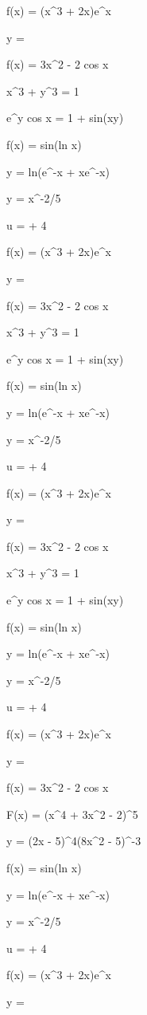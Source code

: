 \documentclass[11pt,a4paper]{article}
\begin{document}
f(x) = (x^3 + 2x)e^x

y = 

f(x) = 3x^2 - 2 cos x


 x^3 + y^3 = 1

 e^y cos x = 1 + sin(xy)

 f(x) = sin(ln x)

 y = ln(e^{-x} + xe^{-x})

y = x^{-2/5}

u =  + 4

f(x) = (x^3 + 2x)e^x

y = 

f(x) = 3x^2 - 2 cos x


 x^3 + y^3 = 1

 e^y cos x = 1 + sin(xy)

 f(x) = sin(ln x)

 y = ln(e^{-x} + xe^{-x})

y = x^{-2/5}

u =  + 4

f(x) = (x^3 + 2x)e^x

y = 

f(x) = 3x^2 - 2 cos x


 x^3 + y^3 = 1

 e^y cos x = 1 + sin(xy)

 f(x) = sin(ln x)

 y = ln(e^{-x} + xe^{-x})

y = x^{-2/5}

u =  + 4

f(x) = (x^3 + 2x)e^x

y = 

f(x) = 3x^2 - 2 cos x


 F(x) = (x^4 + 3x^2 - 2)^5

 y = (2x - 5)^4(8x^2 - 5)^{-3}

 f(x) = sin(ln x)

 y = ln(e^{-x} + xe^{-x})

y = x^{-2/5}

u =  + 4

f(x) = (x^3 + 2x)e^x

y = 
\end{document}
